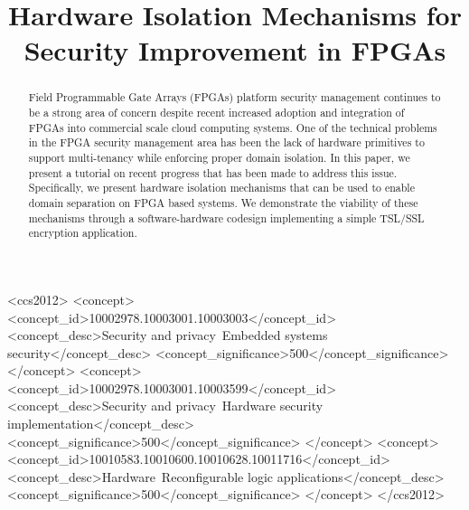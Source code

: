 \documentclass[sigconf]{acmart}
\theoremstyle{plain}
\theoremstyle{remark}
\begin{document}
\title{Hardware Isolation Mechanisms for Security Improvement in FPGAs}
%
%
%
%


\begin{abstract}
Field Programmable Gate Arrays (FPGAs) platform security management continues to be a strong area of concern despite recent increased adoption and integration of FPGAs into commercial scale cloud computing systems. One of the technical problems in the FPGA security management area has been the lack of hardware primitives to support multi-tenancy while enforcing proper domain isolation. In this paper, we present a tutorial on recent progress that has been made to address this issue. Specifically, we present hardware isolation mechanisms that can be used to enable domain separation on FPGA based systems. We demonstrate the viability of these mechanisms through a software-hardware codesign implementing a simple TSL/SSL encryption application.
\end{abstract}


\begin{CCSXML}
<ccs2012>
<concept>
<concept_id>10002978.10003001.10003003</concept_id>
<concept_desc>Security and privacy~Embedded systems security</concept_desc>
<concept_significance>500</concept_significance>
</concept>
<concept>
<concept_id>10002978.10003001.10003599</concept_id>
<concept_desc>Security and privacy~Hardware security implementation</concept_desc>
<concept_significance>500</concept_significance>
</concept>
<concept>
<concept_id>10010583.10010600.10010628.10011716</concept_id>
<concept_desc>Hardware~Reconfigurable logic applications</concept_desc>
<concept_significance>500</concept_significance>
</concept>
</ccs2012>
\end{CCSXML}

\end{document}
